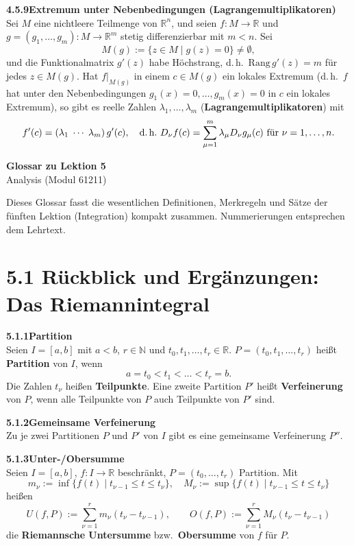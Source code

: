 \documentclass[a4paper,12pt]{article}
\newcommand{\gentry}[3]{%
  \noindent\textbf{#1\quad #2}\nopagebreak\\[0.2em]
  #3\par\smallskip
}
\begin{document}
\gentry{4.5.9}{Extremum unter Nebenbedingungen (Lagrangemultiplikatoren)}{%
  Sei $M$ eine nichtleere Teilmenge von $\mathbb{R}^n$, und seien $f: M \to \mathbb{R}$ und
  $g = (g_1, \ldots, g_m): M \to \mathbb{R}^m$ stetig differenzierbar mit $m < n$. Sei
  \[
    M(g) := \{ z \in M \mid g(z) = 0 \} \neq \emptyset,
  \]
  und die Funktionalmatrix $g'(z)$ habe Höchstrang, d.\,h.\ $\mathrm{Rang}\,g'(z) = m$ für jedes
  $z \in M(g)$. Hat $f|_{M(g)}$ in einem $c \in M(g)$ ein lokales Extremum (d.\,h.\ $f$ hat unter
  den Nebenbedingungen $g_1(x) = 0, \ldots, g_m(x) = 0$ in $c$ ein lokales Extremum), so gibt
  es reelle Zahlen $\lambda_1, \ldots, \lambda_m$ (\textbf{Lagrangemultiplikatoren}) mit
  \[
    f'(c) = (\lambda_1 \; \cdots \; \lambda_m)\,g'(c),
    \quad \text{d.\,h.\ } D_\nu f(c) = \sum_{\mu=1}^{m} \lambda_\mu D_\nu g_\mu(c) \text{ für } \nu = 1, \ldots, n.
  \]
}

\newpage

\begin{center}
  {\LARGE\bfseries Glossar zu Lektion 5}\\[0.5em]
  {\large Analysis (Modul 61211)}
\end{center}

\vspace{1em}

Dieses Glossar fasst die wesentlichen Definitionen, Merkregeln und Sätze der
fünften Lektion (Integration) kompakt zusammen. Nummerierungen entsprechen
dem Lehrtext.

\section*{5.1 \quad Rückblick und Ergänzungen: Das Riemannintegral}

\gentry{5.1.1}{Partition}{%
  Seien $I = [a,b]$ mit $a<b$, $r \in \mathbb{N}$ und $t_0, t_1, \ldots, t_r \in \mathbb{R}$.
  $P = (t_0, t_1, \ldots, t_r)$ heißt \textbf{Partition} von $I$, wenn
  \[
    a = t_0 < t_1 < \ldots < t_r = b.
  \]
  Die Zahlen $t_\nu$ heißen \textbf{Teilpunkte}. Eine zweite Partition $P'$ heißt
  \textbf{Verfeinerung} von $P$, wenn alle Teilpunkte von $P$ auch Teilpunkte
  von $P'$ sind.
}

\gentry{5.1.2}{Gemeinsame Verfeinerung}{%
  Zu je zwei Partitionen $P$ und $P'$ von $I$ gibt es eine gemeinsame
  Verfeinerung $P''$.
}

\gentry{5.1.3}{Unter-/Obersumme}{%
  Seien $I=[a,b]$, $f: I \to \mathbb{R}$ beschränkt, $P = (t_0,\ldots,t_r)$ Partition.
  Mit
  \[
    m_\nu := \inf\{f(t)\mid t_{\nu-1} \leq t \leq t_\nu\}, \quad
    M_\nu := \sup\{f(t)\mid t_{\nu-1} \leq t \leq t_\nu\}
  \]
  heißen
  \[
    U(f,P) := \sum_{\nu=1}^{r} m_\nu (t_\nu - t_{\nu-1}), \qquad
    O(f,P) := \sum_{\nu=1}^{r} M_\nu (t_\nu - t_{\nu-1})
  \]
  die \textbf{Riemannsche Untersumme} bzw.\ \textbf{Obersumme} von $f$ für $P$.
}
\end{document}
